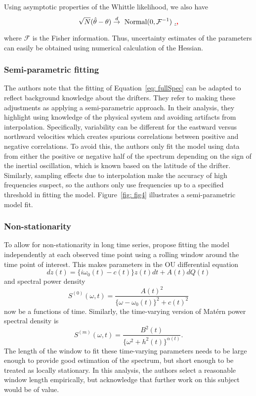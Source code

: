 \documentclass{stat572Style}
\newcommand{\vmdel}[1]{\sout{#1}}
\newcommand{\vmadd}[1]{\textbf{\color{red}{#1}}}
\begin{document}
Using asymptotic properties of the Whittle likelihood, we also have 
\begin{equation}
\label{eq: fisher}
\sqrt{N}(\hat{\theta} - \theta) \overset{d}{\rightarrow} \text{ Normal($0, \mathcal{F}^{-1})$ }\vmdel{.}\vmadd{,}
\end{equation}
where $\mathcal{F}$ is the Fisher information. 
Thus, uncertainty estimates of the parameters can easily be obtained using numerical calculation of the Hessian. 

\subsubsection{Semi-parametric fitting}
\label{sec: semi}
The authors note that the fitting of Equation~\ref{eq: fullSpec} can be adapted to reflect background knowledge about the drifters. 
They refer to making these adjustments as applying a semi-parametric approach. 
In their analysis, they highlight using knowledge of the physical system and avoiding artifacts from interpolation. 
Specifically,  variability can be different for the eastward versus northward velocities  which creates spurious correlations between positive and negative correlations. 
To avoid this, the authors only fit the model using data from either the positive or negative half of the spectrum depending on the sign of the inertial oscillation, which is known based on the latitude of the drifter.  
Similarly, sampling effects due to interpolation make the accuracy of high frequencies suspect, so the authors only use frequencies up to a specified threshold in fitting the model. Figure~\ref{fig: fig4} illustrates a semi-parametric model fit. 

\subsubsection{Non-stationarity}
To allow for non-stationarity in long time series, \citet{Sykulski2016} propose fitting the model independently at each observed time point using a rolling window around the time point of interest. 
This makes parameters in the OU differential equation
\begin{equation}
dz(t) = \{i \omega_{0}(t) - c(t) \} z(t) dt + A(t) dQ(t)
\end{equation}
and spectral power density
\begin{equation}
S^{(0)}(\omega, t) = \frac{A(t)^{2}}{\{\omega - \omega_{0}(t)\}^{2} + c(t)^{2}}
\end{equation}
 now be a functions of time. 
Similarly, the time-varying version of Mat\'{e}rn power spectral density is 
\begin{equation}
S^{(m)}(\omega, t) = \frac{B^{2}(t)}{\{\omega^{2} + h^{2}(t)\}^{\alpha(t)}}.
\end{equation}
The length of the window to fit these time-varying parameters needs to be large enough to provide good estimation of the spectrum, but short enough to be treated as locally stationary. 
 In this analysis, the authors select a reasonable window length empirically, but acknowledge that further work on this subject would be of value.  
\end{document}
